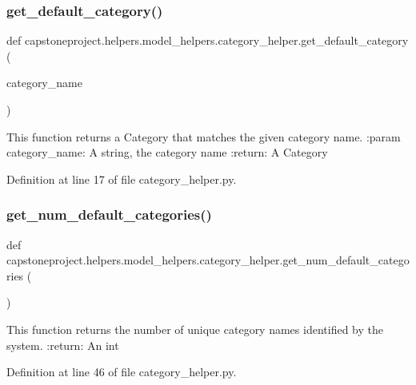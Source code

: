 \subsubsection{\texorpdfstring{get\+\_\+default\+\_\+category()}{get\_default\_category()}}
{\footnotesize\ttfamily def capstoneproject.\+helpers.\+model\+\_\+helpers.\+category\+\_\+helper.\+get\+\_\+default\+\_\+category (\begin{DoxyParamCaption}\item[{}]{category\+\_\+name }\end{DoxyParamCaption})}

\begin{DoxyVerb}This function returns a Category that matches the given category name.
:param category_name: A string, the category name
:return: A Category
\end{DoxyVerb}
 

Definition at line 17 of file category\+\_\+helper.\+py.

\mbox{\label{namespacecapstoneproject_1_1helpers_1_1model__helpers_1_1category__helper_a89b339524f94e2d1b579f03601c9c37e}} 
\subsubsection{\texorpdfstring{get\+\_\+num\+\_\+default\+\_\+categories()}{get\_num\_default\_categories()}}
{\footnotesize\ttfamily def capstoneproject.\+helpers.\+model\+\_\+helpers.\+category\+\_\+helper.\+get\+\_\+num\+\_\+default\+\_\+categories (\begin{DoxyParamCaption}{ }\end{DoxyParamCaption})}

\begin{DoxyVerb}This function returns the number of unique category names identified by the system.
:return: An int
\end{DoxyVerb}
 

Definition at line 46 of file category\+\_\+helper.\+py.

